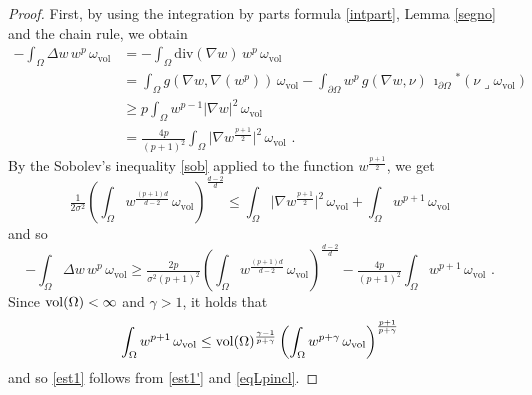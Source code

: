 \documentclass[10pt, a4paper, reqno, oneside]{amsart}
\theoremstyle{plain}
\theoremstyle{definition}
\theoremstyle{plain}
\theoremstyle{definition}
\theoremstyle{plain}
\renewcommand{\=}{:=}
\begin{document}
\begin{proof}
First, by using the integration by parts formula \eqref{intpart}, Lemma \ref{segno} and the chain rule, we obtain $$\begin{aligned}
-\int_\Omega \Delta w\,w^p\,\omega_{\mathrm{vol}} &= -\int_\Omega \mathrm{div}(\nabla w)\,w^p\,\omega_{\mathrm{vol}} \\ 
&=  \int_\Omega g(\nabla w, \nabla(w^p))\,\omega_{\mathrm{vol}} - \int_{\partial \Omega} w^p\,g(\nabla w, \nu) \, \imath_{\partial\Omega}{}^*(\nu \!\lrcorner \omega_{\mathrm{vol}}) \\
&\geq p\int_\Omega w^{p-1}|\nabla w|^2\,\omega_{\mathrm{vol}} \\
&= \tfrac{4p}{(p+1)^2}\int_\Omega \big|\nabla w^{\frac{p+1}2}\big|^2\,\omega_{\mathrm{vol}} \,\, .
\end{aligned}$$
By the Sobolev's inequality \eqref{sob} applied to the function $w^{\frac{p+1}2}$, we get
$$
\tfrac1{2\sigma^2}\left(\int_\Omega w^\frac{(p+1)d}{d-2}\,\omega_{\mathrm{vol}}\right)^{\frac{d-2}d} \leq \int_\Omega \big|\nabla w^{\frac{p+1}2}\big|^2\,\omega_{\mathrm{vol}}+ \int_\Omega w^{p+1}\,\omega_{\mathrm{vol}}
$$
and so
\begin{equation} \label{est1'}
-\int_\Omega \Delta w\,w^p\,\omega_{\mathrm{vol}} \geq \tfrac{2p}{\sigma^2(p+1)^2} \left(\int_\Omega w^\frac{(p+1)d}{d-2}\,\omega_{\mathrm{vol}}\right)^{\frac{d-2}d} -\tfrac{4p}{(p+1)^2}\int_\Omega w^{p+1}\,\omega_{\mathrm{vol}} \,\, .
\end{equation}
Since ${\rm vol}(\Omega)<\infty$ and $\gamma>1$, it holds that
\begin{equation} \label{eqLpincl}
\int_\Omega w^{p+1}\,\omega_{\mathrm{vol}} \leq {\rm vol}(\Omega)^{\frac{\gamma-1}{p+\gamma}}\left(\int_\Omega w^{p+\gamma}\,\omega_{\mathrm{vol}}\right)^{\frac{p+1}{p+\gamma}}
\end{equation}
and so \eqref{est1} follows from \eqref{est1'} and \eqref{eqLpincl}.


\end{proof}
\end{document}
